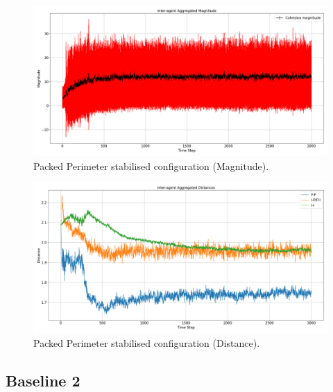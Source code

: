 \documentclass[12pt,a4paper]{IEEEtran}
\begin{document}
\begin{figure}[H]
	\begin{center}
		\includegraphics[width=1.0\linewidth]{figures/tightPerimMagnitude}
	\end{center}
	\caption{Packed Perimeter stabilised configuration (Magnitude). \label{fig:tightPerimMagnitude}}
\end{figure}

\begin{figure}[H]
	\begin{center}
		\includegraphics[width=1.0\linewidth]{figures/tightPerimDistance}
	\end{center}
	\caption{Packed Perimeter stabilised configuration (Distance). \label{fig:tightPerimDistance}}
\end{figure}


\subsection{Baseline 2}
\end{document}
